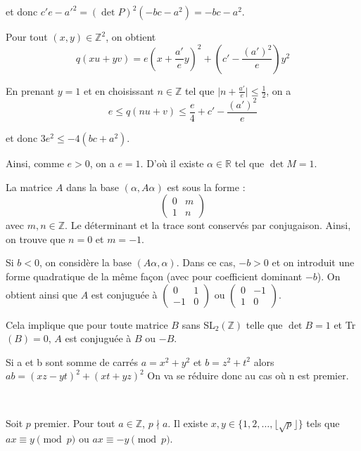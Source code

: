 et donc $c' {e - a'}^2 = (\det P)^2  (- bc - a^2) = - bc - a^2$.

Pour tout $(x, y) \in \mathbb{Z}^2$, on obtient
\[ q (xu + yv) = e \left( x + \frac{a'}{e} y \right)^2 + \left( c' -
   \frac{(a')^2}{e} \right) y^2 \]


En prenant $y = 1$ et en choisissant $n \in \mathbb{Z}$ tel que $\lvert n +
\frac{a'}{e} \rvert \leq \frac{1}{2}$, on a
\[ e \leq q (nu + v) \leq \frac{e}{4} + c' - \frac{(a')^2}{e} \]


et donc $3 e^2 \leq - 4 (bc + a^2)$.


Ainsi, comme $e > 0$, on a $e = 1$. D'o{\`u} il existe $\alpha \in \mathbb{R}$
tel que $\det M = 1$.

La matrice $A$ dans la base $(\alpha, A \alpha)$ est sous la forme :
\[ \left(\begin{array}{cc}
     0 & m\\
     1 & n
   \end{array}\right) \]
avec $m, n \in \mathbb{Z}$. Le d{\'e}terminant et la trace sont conserv{\'e}s
par conjugaison. Ainsi, on trouve que $n = 0$ et $m = - 1$.

Si $b < 0$, on consid{\`e}re la base $(A \alpha, \alpha)$. Dans ce cas, $- b
> 0$ et on introduit une forme quadratique de la m{\^e}me fa{\c c}on (avec
pour coefficient dominant $- b$). On obtient ainsi que $A$ est conjugu{\'e}e
{\`a} $\left(\begin{array}{cc}
  0 & 1\\
  - 1 & 0
\end{array}\right)$ ou $\left(\begin{array}{cc}
  0 & - 1\\
  1 & 0
\end{array}\right)$.

Cela implique que pour toute matrice $B$ sans SL$_2 (\mathbb{Z})$ telle que
$\det B = 1$ et Tr$(B) = 0$, $A$ est conjugu{\'e}e {\`a} $B$ ou $- B$.

 Si a et b sont somme de carr{\'e}s $a = x^2 + y^2$ et $b = z^2 +
t^2$ alors $ab = (xz - yt)^2 + (xt + yz)^2$ On va se r{\'e}duire donc au cas
o{\`u} n est premier.

\


Soit $p$ premier. Pour tout $a \in \mathbb{Z}$, $p \nmid a$. Il existe $x, y
\in \{1, 2, \ldots, \lfloor \sqrt{p} \rfloor\}$ tels que $ax \equiv y
\pmod{p}$ ou $ax \equiv - y \pmod{p}$.

